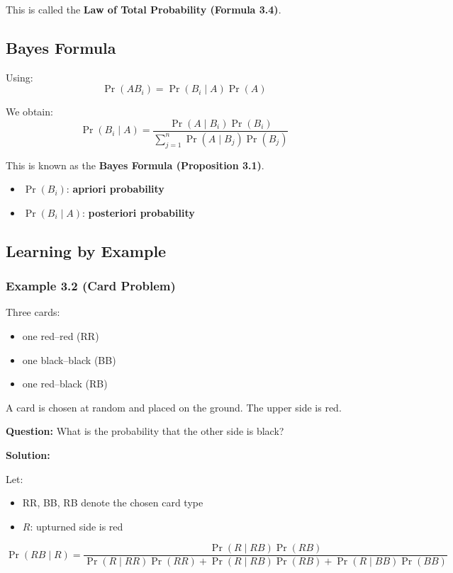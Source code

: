 \documentclass[11pt]{article}
\begin{document}
This is called the \textbf{Law of Total Probability (Formula 3.4)}.

\subsection{Bayes Formula}

Using:
\[
\Pr(AB_i) = \Pr(B_i \mid A)\Pr(A)
\]

We obtain:
\[
\Pr(B_i \mid A) =
\frac{\Pr(A \mid B_i)\Pr(B_i)}
{\sum_{j=1}^{n} \Pr(A \mid B_j)\Pr(B_j)}
\]

This is known as the \textbf{Bayes Formula (Proposition 3.1)}.

\begin{itemize}[leftmargin=1.5em]
    \item $\Pr(B_i)$: \textbf{apriori probability}
    \item $\Pr(B_i \mid A)$: \textbf{posteriori probability}
\end{itemize}

\subsection{Learning by Example}

\subsubsection*{Example 3.2 (Card Problem)}

Three cards:
\begin{itemize}[leftmargin=1.5em]
    \item one red--red (RR)
    \item one black--black (BB)
    \item one red--black (RB)
\end{itemize}

A card is chosen at random and placed on the ground.  
The upper side is red.

\textbf{Question:}  
What is the probability that the other side is black?

\textbf{Solution:}

Let:
\begin{itemize}[leftmargin=1.5em]
    \item RR, BB, RB denote the chosen card type
    \item $R$: upturned side is red
\end{itemize}

\[
\Pr(RB \mid R) =
\frac{\Pr(R \mid RB)\Pr(RB)}
{\Pr(R \mid RR)\Pr(RR) + \Pr(R \mid RB)\Pr(RB) + \Pr(R \mid BB)\Pr(BB)}
\]
\end{document}
